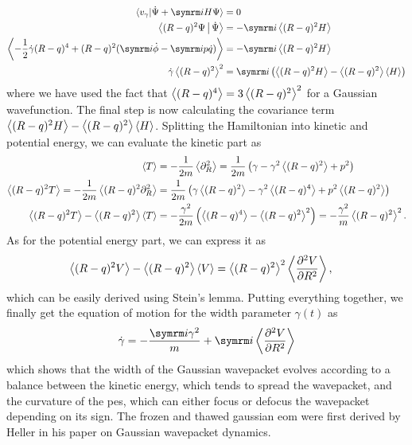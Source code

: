 \begin{align}
\braket{v_\gamma|\dot\Psi+\i H\Psi}&=0\\
\Braket{(R-q)^2\Psi|\dot\Psi}&=-\i\Braket{(R-q)^2H}\\
\Braket{-\frac{1}{2}\dot\gamma(R-q)^4+(R-q)^2(\i\dot\phi-\i p\dot q)}&=-\i\Braket{(R-q)^2H}\\
\dot\gamma\Braket{(R-q)^2}^2&=\i\left(\Braket{(R-q)^2H}-\Braket{(R-q)^2}\Braket{H}\right)
\end{align}
where we have used the fact that $\Braket{(R-q)^4}=3\Braket{(R-q)^2}^2$ for a Gaussian wavefunction. The final step is now calculating the covariance term $\Braket{(R-q)^2H}-\Braket{(R-q)^2}\Braket{H}$. Splitting the Hamiltonian into kinetic and potential energy, we can evaluate the kinetic part as
\begin{align}
\braket{T}&=-\frac{1}{2m}\Braket{\partial_R^2}=\frac{1}{2m}\left(\gamma-\gamma^2\Braket{(R-q)^2}+p^2\right)\\
\Braket{(R-q)^2T}=-\frac{1}{2m}\Braket{(R-q)^2\partial_R^2}&=\frac{1}{2m}\left(\gamma\Braket{(R-q)^2}-\gamma^2\Braket{(R-q)^4}+p^2\Braket{(R-q)^2}\right)\\
\Braket{(R-q)^2T}-\Braket{(R-q)^2}\Braket{T}&=-\frac{\gamma^2}{2m}\left(\Braket{(R-q)^4}-\Braket{(R-q)^2}^2\right)=-\frac{\gamma^2}{m}\Braket{(R-q)^2}^2.
\end{align}
As for the potential energy part, we can express it as
\begin{align}
\Braket{(R-q)^2V}-\Braket{(R-q)^2}\Braket{V}&=\Braket{(R-q)^2}^2\Braket{\frac{\partial^2 V}{\partial R^2}},
\end{align}
which can be easily derived using Stein's lemma. Putting everything together, we finally get the equation of motion for the width parameter $\gamma(t)$ as
\begin{equation}
\dot\gamma=-\frac{\i\gamma^2}{m}+\i\Braket{\frac{\partial^2 V}{\partial R^2}}
\end{equation}
which shows that the width of the Gaussian wavepacket evolves according to a balance between the kinetic energy, which tends to spread the wavepacket, and the curvature of the \gls{pes}, which can either focus or defocus the wavepacket depending on its sign. The frozen and thawed gaussian \gls{eom} were first derived by Heller in his paper on Gaussian wavepacket dynamics.~\supercite{10.1063/1.430620}
